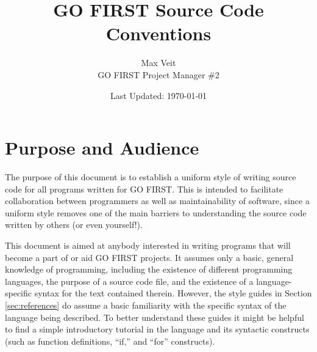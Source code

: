 \documentclass[12pt]{article}
\begin{document}
\title{GO FIRST Source Code Conventions}
\author{Max Veit\\
GO FIRST Project Manager \#2}
\date{Last Updated: \today}

\maketitle
\tableofcontents
\thispagestyle{fancy}

\section{Purpose and Audience}
The purpose of this document is to establish a uniform style of writing source code for all programs written for GO FIRST. This is intended to facilitate collaboration between programmers as well as maintainability of software, since a uniform style removes one of the main barriers to understanding the source code written by others (or even yourself!). 

This document is aimed at anybody interested in writing programs that will become a part of or aid GO FIRST projects. It assumes only a basic, general knowledge of programming, including the existence of different programming languages, the purpose of a source code file, and the existence of a language-specific syntax for the text contained therein. However, the style guides in Section \ref{sec:references} do assume a basic familiarity with the specific syntax of the language being described. To better understand these guides it might be helpful to find a simple introductory tutorial in the language and its syntactic constructs (such as function definitions, ``if,'' and ``for'' constructs).
\end{document}
